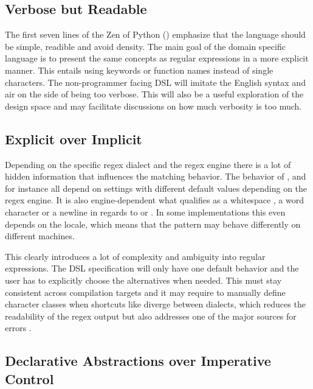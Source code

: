 \subsection{Verbose but Readable}

The first seven lines of the Zen of Python () emphasize that the language should be simple, readible and avoid density. The main goal of the domain specific language is to present the same concepts as regular expressions in a more explicit manner. This entails using keywords or function names instead of single characters. The non-programmer facing DSL will imitate the English syntax and air on the side of being too verbose. This will also be a useful exploration of the design space and may facilitate discussions on how much verbosity is too much.

\subsection{Explicit over Implicit} \label{sec:explicitOverImplicit}

Depending on the specific regex dialect and the regex engine there is a lot of hidden information that influences the matching behavior. The behavior of \pattern{\caret}, \pattern{\$} and  for instance all depend on settings with different default values depending on the regex engine. It is also engine-dependent what qualifies as a whitespace , a word character  or a newline in regards to \pattern{\caret} or \pattern{\$}. In some implementations this even depends on the locale, which means that the pattern may behave differently on different machines.

This clearly introduces a lot of complexity and ambiguity into regular expressions. The DSL specification will only have one default behavior and the user has to explicitly choose the alternatives when needed. This must stay consistent across compilation targets and it may require to manually define character classes when shortcuts like  diverge between dialects, which reduces the readability of the regex output but also addresses one of the major sources for errors \cite{RegexNotLinguaFranca}.

\subsection{Declarative Abstractions over Imperative Control} \label{sec:declarativeOverImparative}

